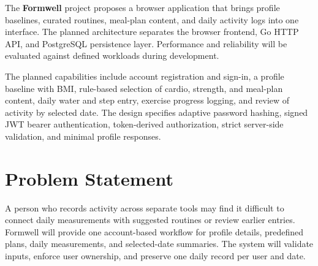 \documentclass[11pt,a4paper]{report}
\begin{document}
The \textbf{Formwell} project proposes a browser application that brings profile baselines, curated routines, meal-plan content, and daily activity logs into one interface. The planned architecture separates the browser frontend, Go HTTP API, and PostgreSQL persistence layer. Performance and reliability will be evaluated against defined workloads during development.

The planned capabilities include account registration and sign-in, a profile baseline with BMI, rule-based selection of cardio, strength, and meal-plan content, daily water and step entry, exercise progress logging, and review of activity by selected date. The design specifies adaptive password hashing, signed JWT bearer authentication, token-derived authorization, strict server-side validation, and minimal profile responses. 
\section{Problem Statement}
A person who records activity across separate tools may find it difficult to connect daily measurements with suggested routines or review earlier entries. Formwell will provide one account-based workflow for profile details, predefined plans, daily measurements, and selected-date summaries. The system will validate inputs, enforce user ownership, and preserve one daily record per user and date.
\end{document}
